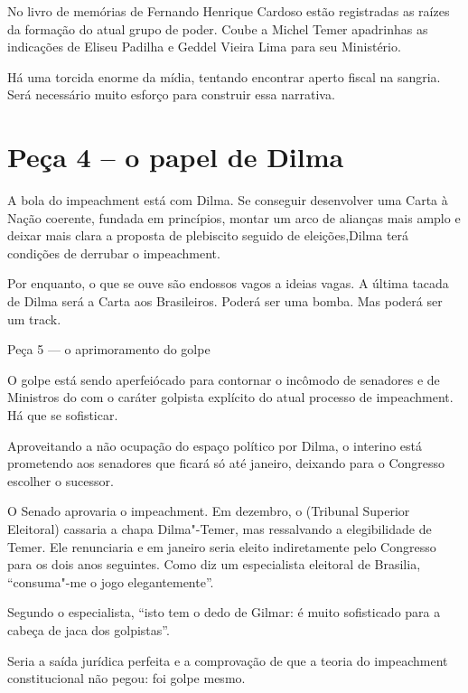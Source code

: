 No livro de memórias de Fernando Henrique Cardoso estão registradas as
raízes da formação do atual grupo de poder. Coube a Michel Temer
apadrinhas as indicações de Eliseu Padilha e Geddel Vieira Lima para seu
Ministério.

Há uma torcida enorme da mídia, tentando encontrar aperto fiscal na
sangria. Será necessário muito esforço para construir essa narrativa.

\section{Peça 4 -- o papel de Dilma}

A bola do impeachment está com Dilma. Se conseguir desenvolver uma Carta
à Nação coerente, fundada em princípios, montar um arco de alianças mais
amplo e deixar mais clara a proposta de plebiscito seguido de
eleições,Dilma terá condições de derrubar o impeachment.

Por enquanto, o que se ouve são endossos vagos a ideias vagas. A última
tacada de Dilma será a Carta aos Brasileiros. Poderá ser uma bomba. Mas
poderá ser um track.

Peça 5 --- o aprimoramento do golpe

O golpe está sendo aperfeiócado para contornar o incômodo de senadores e
de Ministros do  com o caráter golpista explícito do atual processo
de impeachment. Há que se sofisticar.

Aproveitando a não ocupação do espaço político por Dilma, o interino
está prometendo aos senadores que ficará só até janeiro, deixando para o
Congresso escolher o sucessor.

O Senado aprovaria o impeachment. Em dezembro, o  (Tribunal Superior
Eleitoral) cassaria a chapa Dilma"-Temer, mas ressalvando a elegibilidade
de Temer. Ele renunciaria e em janeiro seria eleito indiretamente pelo
Congresso para os dois anos seguintes. Como diz um especialista
eleitoral de Brasilia, ``consuma"-me o jogo elegantemente''.

Segundo o especialista, ``isto tem o dedo de Gilmar: é muito sofisticado
para a cabeça de jaca dos golpistas''.

Seria a saída jurídica perfeita e a comprovação de que a teoria do
impeachment constitucional não pegou: foi golpe mesmo.
